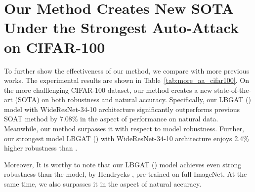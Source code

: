\documentclass[10pt,twocolumn,letterpaper]{article}
\begin{document}
\vspace{0.2in}
\section{Our Method Creates New SOTA Under the Strongest Auto-Attack on CIFAR-100}
To further show the effectiveness of our method, we compare with more previous works. The experimental results are shown in Table~\ref{tab:more_aa_cifar100}. On the more challlenging CIFAR-100 dataset, our method creates a new state-of-the-art (SOTA) on both robustness and natural accuracy. Specifically, our LBGAT () model with WideResNet-34-10 architecture significantly outperforms previous SOAT method \cite{chen2020efficient} by 7.08\% in the aspect of performance on natural data. Meanwhile, our method surpasses it with respect to model robustness. Further, our strongest model LBGAT () with WideResNet-34-10 architecture enjoys 2.4\% higher robustness than \cite{chen2020efficient}.  

Moreover, It is worthy to note that our LBGAT () model achieves even strong robustness than the model, by Hendrycks \etal \cite{hendrycks2019using}, pre-trained on full ImageNet. At the same time, we also surpasses it in the aspect of natural accuracy.   
\end{document}
